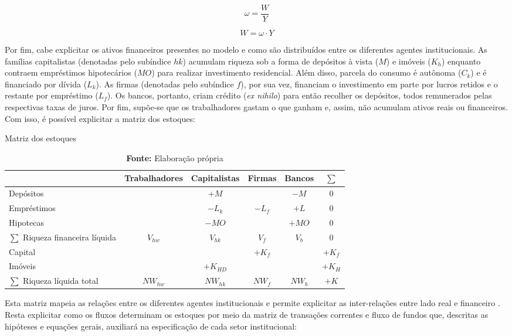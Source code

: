 
$$
\omega = \frac{W}{Y}
$$

\begin{equation}
\label{_W}
    W = \omega\cdot Y
\end{equation}

Por fim, cabe explicitar os ativos financeiros presentes no modelo e como são distribuídos entre os diferentes agentes institucionais. As famílias capitalistas (denotadas pelo subíndice $hk$) acumulam riqueza sob a forma de depósitos à vista ($M$) e imóveis ($K_h$) enquanto contraem empréstimos hipotecários ($MO$) para realizar investimento residencial.
Além disso, parcela do consumo é autônoma ($C_k$) e é financiado por dívida ($L_k$).
As firmas (denotadas pelo subíndice $f$), por sua vez, financiam o investimento em parte por lucros retidos e o restante por empréstimo ($L_f$). Os bancos, portanto, criam crédito (\textit{ex nihilo}) para então recolher os depósitos, todos remunerados pelas respectivas taxas de juros. 
Por fim, supõe-se que os trabalhadores gastam o que ganham e, assim, não acumulam ativos reais ou financeiros.
Com isso, é possível explicitar a matriz dos estoques:


\begin{table}[H]
\centering
\caption{Matriz dos estoques}
\begin{tabular}{lccccc}
\hline
\hline


                          & Trabalhadores & Capitalistas      & Firmas        & Bancos  &    $\sum$ \\ \hline

Depósitos & & $+M$ & & $-M$ & 0\\
Empréstimos& &$-L_k$ &$-L_f$& $+L$ & 0\\
Hipotecas & &$-MO$&  & $+MO$ & 0\\\hline
$\sum$ Riqueza financeira líquida &$V_{hw}$ &$V_{hk}$&$V_f$&$V_b$& $0$\\\hline
Capital & & &$+K_f$&  & $+K_f$\\
Imóveis & &$+K_{HD}$& &   & $+K_{H}$\\\hline
$\sum$ Riqueza líquida total &$NW_{hw}$&$NW_{hk}$&$NW_f$&$NW_b$& $+K$\\
\hline
\hline
\end{tabular}%
\caption*{\textbf{Fonte:} Elaboração própria}
\end{table}

Esta matriz mapeia as relações entre os diferentes agentes institucionais e permite explicitar as inter-relações entre lado real e financeiro \cite{dos_santos_revisiting_2010}. Resta explicitar como os fluxos determinam os estoques por meio da matriz de transações correntes e fluxo de fundos que, descritas as hipóteses e equações gerais, auxiliará na especificação de cada setor institucional:

